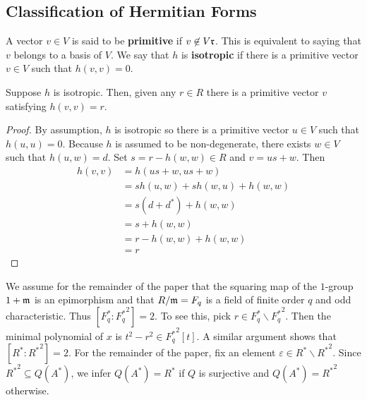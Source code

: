 \begin{center}
\section*{Classification of Hermitian Forms}
\end{center}
A vector $v \in V$ is said to be \textbf{primitive} if $v \not\in V \mathfrak{r}$.
This is equivalent to saying that $v$ belongs to a basis of $V$.
We say that $h$ is \textbf{isotropic} if there is a primitive vector $v \in V$ such that $h(v,v) = 0$.

\begin{lemma}\label{lemma3.1}
Suppose $h$ is isotropic. Then, given any $r \in R$ there is a primitive vector $v$ satisfying $h(v,v) = r$.
\end{lemma}

\begin{proof}
By assumption, $h$ is isotropic so there is a primitive vector $u \in V$ such that $h(u,u) = 0$.
Because $h$ is assumed to be non-degenerate, there exists $w \in V$ such that $h(u,w) = d$.
Set $s = r - h(w,w) \in R$ and $v = us + w$.
Then
\begin{align*}
h(v,v) &= h(us + w, us + w) \\
&= sh(u,w) + sh(w,u) + h(w,w) \\
&= s(d + d^*) + h(w,w) \\
&= s + h(w,w)\\
&= r - h(w,w) + h(w,w)\\
&= r
\end{align*}
\end{proof}

We assume for the remainder of the paper that the squaring map of the $1$-group $1 + \mathfrak{m}$ is an epimorphism and that $R/\mathfrak{m} = F_q$
is a field of finite order $q$ and odd characteristic.
Thus $[F_q^* : {F_q^*}^2] = 2$. To see this, pick $r \in F_q^* \backslash {F_q^*}^2$.
Then the minimal polynomial of $x$ is $t^2 - r^2 \in {F_q^*}^2[t]$.
A similar argument shows that $[R^* : {R^*}^2] = 2$.
For the remainder of the paper, fix an element $\varepsilon \in R^* \backslash {R^*}^2$.
Since ${R^*}^2 \subseteq Q(A^*)$, we infer $Q(A^*) = R^*$ if $Q$ is surjective and $Q(A^*) = {R^*}^2$ otherwise.

